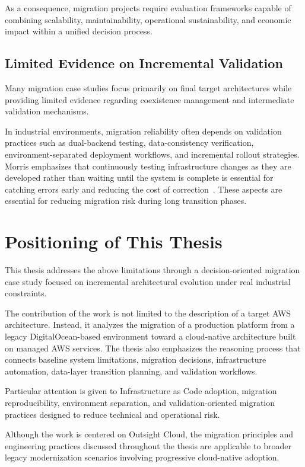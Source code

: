As a consequence, migration projects require evaluation frameworks capable of combining scalability, maintainability, operational sustainability, and economic impact within a unified decision process.

\subsection{Limited Evidence on Incremental Validation}
Many migration case studies focus primarily on final target architectures while providing limited evidence regarding coexistence management and intermediate validation mechanisms.

In industrial environments, migration reliability often depends on validation practices such as dual-backend testing, data-consistency verification, environment-separated deployment workflows, and incremental rollout strategies. Morris emphasizes that continuously testing infrastructure changes as they are developed rather than waiting until the system is complete is essential for catching errors early and reducing the cost of correction~\cite{morris2021iac}. These aspects are essential for reducing migration risk during long transition phases.

\section{Positioning of This Thesis}
This thesis addresses the above limitations through a decision-oriented migration case study focused on incremental architectural evolution under real industrial constraints.

The contribution of the work is not limited to the description of a target AWS architecture. Instead, it analyzes the migration of a production platform from a legacy DigitalOcean-based environment toward a cloud-native architecture built on managed AWS services. The thesis also emphasizes the reasoning process that connects baseline system limitations, migration decisions, infrastructure automation, data-layer transition planning, and validation workflows.

Particular attention is given to Infrastructure as Code adoption, migration reproducibility, environment separation, and validation-oriented migration practices designed to reduce technical and operational risk.

Although the work is centered on Outsight Cloud, the migration principles and engineering practices discussed throughout the thesis are applicable to broader legacy modernization scenarios involving progressive cloud-native adoption.
